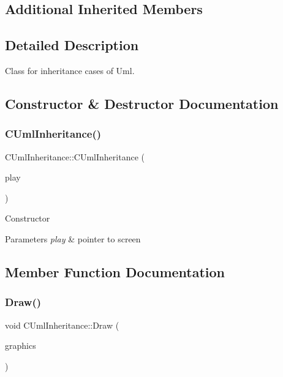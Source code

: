 \subsection*{Additional Inherited Members}


\subsection{Detailed Description}
Class for inheritance cases of Uml. 

\subsection{Constructor \& Destructor Documentation}
\mbox{\label{class_c_uml_inheritance_a5976881e8fc137ac1b8ffa9d136f27d1}} 
\subsubsection{\texorpdfstring{CUmlInheritance()}{CUmlInheritance()}}
{\footnotesize\ttfamily C\+Uml\+Inheritance\+::\+C\+Uml\+Inheritance (\begin{DoxyParamCaption}\item[{\mbox{\hyperlink{class_c_screen}{C\+Screen}} $\ast$}]{play }\end{DoxyParamCaption})\hspace{0.3cm}{\ttfamily [inline]}}

Constructor 
\begin{DoxyParams}{Parameters}
{\em play} & pointer to screen \\
\hline
\end{DoxyParams}


\subsection{Member Function Documentation}
\mbox{\label{class_c_uml_inheritance_a57c02d5be17880c29a3573ead25ecc36}} 
\subsubsection{\texorpdfstring{Draw()}{Draw()}}
{\footnotesize\ttfamily void C\+Uml\+Inheritance\+::\+Draw (\begin{DoxyParamCaption}\item[{Gdiplus\+::\+Graphics $\ast$}]{graphics }\end{DoxyParamCaption})\hspace{0.3cm}{\ttfamily [virtual]}}



